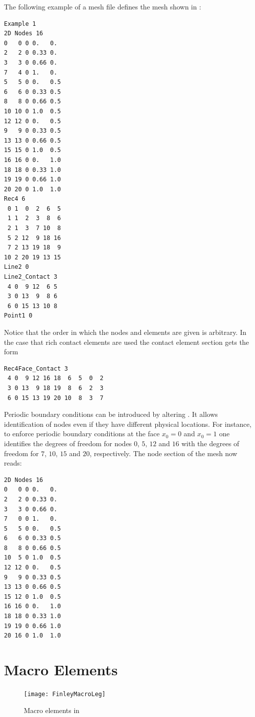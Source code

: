 The following example of a mesh file defines the mesh shown in :
\begin{verbatim}
Example 1
2D Nodes 16
0   0 0 0.   0.
2   2 0 0.33 0.
3   3 0 0.66 0.
7   4 0 1.   0.
5   5 0 0.   0.5
6   6 0 0.33 0.5
8   8 0 0.66 0.5
10 10 0 1.0  0.5
12 12 0 0.   0.5
9   9 0 0.33 0.5
13 13 0 0.66 0.5
15 15 0 1.0  0.5
16 16 0 0.   1.0
18 18 0 0.33 1.0
19 19 0 0.66 1.0
20 20 0 1.0  1.0
Rec4 6
 0 1  0  2  6  5
 1 1  2  3  8  6
 2 1  3  7 10  8
 5 2 12  9 18 16
 7 2 13 19 18  9
10 2 20 19 13 15
Line2 0
Line2_Contact 3
 4 0  9 12  6 5
 3 0 13  9  8 6
 6 0 15 13 10 8
Point1 0
\end{verbatim}
Notice that the order in which the nodes and elements are given is arbitrary.
In the case that rich contact elements are used the contact element section
gets the form
\begin{verbatim}
Rec4Face_Contact 3
 4 0  9 12 16 18  6  5  0  2
 3 0 13  9 18 19  8  6  2  3
 6 0 15 13 19 20 10  8  3  7
\end{verbatim}
Periodic boundary conditions can be
introduced by altering .
It allows identification of nodes even if they have different physical locations.
For instance, to enforce periodic boundary conditions at the face $x_0=0$ and
$x_0=1$ one identifies the degrees of freedom for nodes $0$, $5$, $12$ and $16$
with the degrees of freedom for $7$, $10$, $15$ and $20$, respectively.
The node section of the \finley mesh now reads:
\begin{verbatim}
2D Nodes 16
0   0 0 0.   0.
2   2 0 0.33 0.
3   3 0 0.66 0.
7   0 0 1.   0.
5   5 0 0.   0.5
6   6 0 0.33 0.5
8   8 0 0.66 0.5
10  5 0 1.0  0.5
12 12 0 0.   0.5
9   9 0 0.33 0.5
13 13 0 0.66 0.5
15 12 0 1.0  0.5
16 16 0 0.   1.0
18 18 0 0.33 1.0
19 19 0 0.66 1.0
20 16 0 1.0  1.0
\end{verbatim}

\clearpage

\clearpage

\section{Macro Elements}
\label{SEC FINLEY MACRO}

\begin{figure}[th]
\begin{center}
\texttt{[image: FinleyMacroLeg]}\\
\quad
{}
\end{center}
\caption{Macro elements in \finley}
\end{figure}

